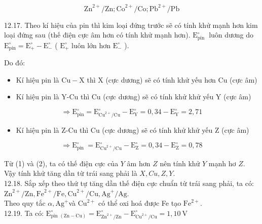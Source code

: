 \documentclass[10pt]{article}
\begin{document}
$$
\mathrm{Zn}^{2+} / \mathrm{Zn} ; \mathrm{Co}^{2+} / \mathrm{Co} ; \mathrm{Pb}^{2+} / \mathrm{Pb}
$$

12.17. Theo kí hiệu của pin thì kim loại đứng trước sẽ có tính khử mạnh hơn kim loại đứng sau (thế điện cực âm hơn có tính khử mạnh hơn). $\mathrm{E}_{\text {pin }}^{\circ}$ luôn dương do $\mathrm{E}_{\mathrm{pin}}^{\circ}=\mathrm{E}_{+}^{\circ}-\mathrm{E}_{-}^{\circ}$ ( $\mathrm{E}_{+}^{\circ}$ luôn lớn hơn $\mathrm{E}_{-}^{\circ}$ ).

Do đó:

\begin{itemize}
  \item Kí hiệu pin là $\mathrm{Cu}-\mathrm{X}$ thì X (cực dương) sẽ có tính khử yếu hơn Cu (cực âm)
  \item Kí hiệu pin là Y-Cu thì Cu (cực dương) sẽ có tính khử khử yếu Y (cực âm)
\end{itemize}


\begin{equation*}
\Rightarrow \mathrm{E}_{\mathrm{pin}}^{\circ}=\mathrm{E}_{\mathrm{Cu}^{2+} / \mathrm{Cu}}^{\circ}-\mathrm{E}_{\mathrm{Y}}^{\circ}=0,34-\mathrm{E}_{\mathrm{Y}}^{\circ}=2,71 \tag{1}
\end{equation*}


\begin{itemize}
  \item Kí hiệu pin là Z-Cu thì Cu (cực dương) sẽ có tính khử khử yếu Z (cực âm)
\end{itemize}


\begin{equation*}
\Rightarrow \mathrm{E}_{\text {pin }}^{\circ}=\mathrm{E}_{\mathrm{Cu}^{2+} / \mathrm{Cu}}^{\circ}-\mathrm{E}_{\mathrm{Z}}^{\circ}=0,34-\mathrm{E}_{\mathrm{Z}}^{\circ}=0,78 \tag{2}
\end{equation*}


Từ (1) và (2), ta có thế điện cực của $Y$ âm hơn $Z$ nên tính khử $Y$ mạnh hơ $Z$.\\
Vậy tính khử tăng dần từ trái sang phải là $X, C u, Z, Y$.\\
12.18. Sắp xếp theo thứ tự tăng dần thế điện cực chuẩn từ trái sang phải, ta có: $\mathrm{Zn}^{2+} / \mathrm{Zn}, \mathrm{Fe}^{2+} / \mathrm{Fe}, \mathrm{Cu}^{2+} / \mathrm{Cu}, \mathrm{Ag}^{+} / \mathrm{Ag}$.\\
Theo quy tắc $\alpha, \mathrm{Ag}^{+}$và $\mathrm{Cu}^{2+}$ có thể oxi hoá được Fe tạo $\mathrm{Fe}^{2+}$.\\
12.19. Ta có: $\mathrm{E}_{\text {pin }(\mathrm{Zn}-\mathrm{Cu})}^{\circ}=\mathrm{E}_{\mathrm{Zn}^{2+} / \mathrm{Zn}}^{\circ}-\mathrm{E}_{\mathrm{Cu}^{2+} / \mathrm{Cu}}^{\circ}=1,10 \mathrm{~V}$
\end{document}
